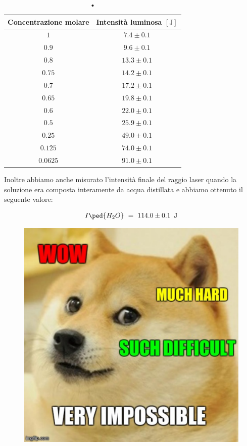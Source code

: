 \begin{table}[t!]
    \centering
    \begin{tabular}{c c }
        \toprule
         Concentrazione molare & Intensità luminosa $[\si{\joule}]$ \\
        \midrule
		$1$ 	& $7.4 \pm 0.1$ \\
		$0.9$ 	& $9.6 \pm 0.1$ \\       
        $0.8$ 	& $13.3 \pm 0.1$ \\
        $0.75$ 	& $14.2 \pm 0.1$ \\
        $0.7$ 	& $17.2 \pm 0.1$ \\
        $0.65$ 	& $19.8 \pm 0.1$ \\
        $0.6$ 	& $22.0 \pm 0.1$ \\
        $0.5$ 	& $25.9 \pm 0.1$ \\
        $0.25$ 	& $49.0 \pm 0.1$ \\
        $0.125$ & $74.0 \pm 0.1$ \\
        $0.0625$ & $91.0 \pm 0.1$ \\
        \bottomrule
    \end{tabular}
    \caption{•}
    \label{tab:dati}
\end{table}
%
Inoltre abbiamo anche misurato l'intensità finale del raggio laser quando la soluzione era composta interamente da acqua distillata e abbiamo ottenuto il seguente valore:

\begin{equation*}
	I\ped{H_2O} \,\,=\,\, 114.0 \pm 0.1 \,\,\, \si{\joule}
\end{equation*}

\begin{figure}[hbtp]
        \centering
        \includegraphics[scale=0.43]{doge.pdf}
\end{figure}